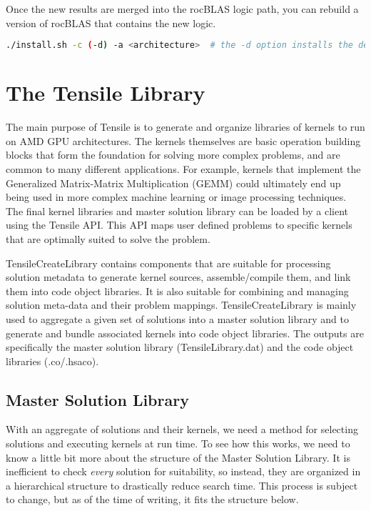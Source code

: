 \documentclass[]{article}
\begin{document}
\noindent
Once the new results are merged into the rocBLAS logic path, you can rebuild a version of rocBLAS that contains the new logic.

\begin{lstlisting}[language=bash]
./install.sh -c (-d) -a <architecture>  # the -d option installs the dependencies, -c build the client apps
\end{lstlisting}

\section{The Tensile Library}
\label{sec:TensileLib}
The main purpose of Tensile is to generate and organize libraries of kernels to run on AMD GPU architectures. The kernels themselves are basic operation building blocks that form the foundation for solving more complex problems, and are common to many different applications. For example, kernels that implement the Generalized Matrix-Matrix Multiplication (GEMM) could ultimately end up being used in more complex machine learning or image processing techniques.
The final kernel libraries and master solution library can be loaded by a client using the Tensile API. This API maps user defined problems to specific kernels that are optimally suited to solve the problem.

TensileCreateLibrary contains components that are suitable for processing solution metadata to generate kernel sources, assemble/compile them, and link them into code object libraries. It is also suitable for combining and managing solution meta-data and their problem mappings. TensileCreateLibrary is mainly used to aggregate a given set of solutions into a master solution library and to generate and bundle associated kernels into code object libraries. The outputs are specifically the master solution library (TensileLibrary.dat) and the code object libraries (.co/.hsaco).

\subsection{Master Solution Library}

With an aggregate of solutions and their kernels, we need a method for selecting solutions and executing kernels at run time. To see how this works, we need to know a little bit more about the structure of the Master Solution Library. It is inefficient to check \textit{every} solution for suitability, so instead, they are organized in a hierarchical structure to drastically reduce search time. This process is subject to change, but as of the time of writing, it fits the structure below.
\end{document}
